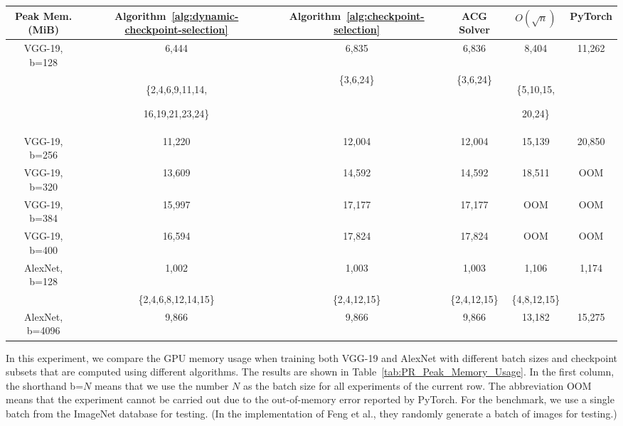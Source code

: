\begin{table*}[h!tb]
\centering
\caption{The Profiling Results of Peak Memory Usage: Finding the Checkpoint Subset Using Different Methods}
\label{tab:PR_Peak_Memory_Usage}
\footnotesize
\begin{tabular}{|c|c|c|c|c|c|}
    \hline
    Peak Mem.(MiB) & Algorithm~\ref{alg:dynamic-checkpoint-selection} & Algorithm~\ref{alg:checkpoint-selection} & ACG Solver & $O(\sqrt{n})$ & PyTorch \\
    \hline
    \hline
    VGG-19, b=128 & 6,444 & 6,835 & 6,836 & 8,404 & 11,262 \\
    & {\{2,4,6,9,11,14,\par 16,19,21,23,24\}} & \{3,6,24\} & \{3,6,24\} & {\{5,10,15,\par 20,24\}} & \\
    \hline
    VGG-19, b=256 & 11,220 & 12,004 & 12,004 & 15,139 & 20,850 \\
    \hline
    VGG-19, b=320 & 13,609 & 14,592 & 14,592 & 18,511 & OOM \\
    \hline
    VGG-19, b=384 & 15,997 & 17,177 & 17,177 & OOM & OOM \\
    \hline
    VGG-19, b=400 & 16,594 & 17,824 & 17,824 & OOM & OOM \\
    \hline
    \hline
    AlexNet, b=128 & 1,002 & 1,003 & 1,003 & 1,106 & 1,174 \\
    & \{2,4,6,8,12,14,15\} & \{2,4,12,15\} & \{2,4,12,15\} & \{4,8,12,15\} & \\
    \hline
    AlexNet, b=4096 & 9,866 & 9,866 & 9,866 & 13,182 & 15,275 \\
    \hline
\end{tabular}
\end{table*}

In this experiment, we compare the GPU memory usage when training both VGG-19 and AlexNet with different batch sizes and checkpoint subsets that are computed using different algorithms. The results are shown in Table~\ref{tab:PR_Peak_Memory_Usage}.
In the first column, the shorthand b=$N$ means that we use the number $N$ as the batch size for all experiments of the current row. The abbreviation OOM means that the experiment cannot be carried out due to the out-of-memory error reported by PyTorch.
For the benchmark, we use a single batch from the ImageNet database for testing. (In the implementation of Feng et al., they randomly generate a batch of images for testing.)

